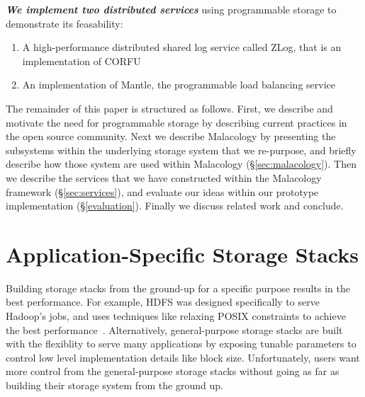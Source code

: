 \documentclass[preprint]{sigplanconf-eurosys}
\begin{document}
{\it \textbf{We implement two distributed services}} using programmable storage
to demonstrate its feasability:

\begin{enumerate}

\item A high-performance distributed shared log service called ZLog, that is an
implementation of CORFU~\cite{balakrishnan_corfu_2012}

\item An implementation of Mantle, the programmable load balancing
service~\cite{sevilla:sc15-mantle}

\end{enumerate}

The remainder of this paper is structured as follows. First, we describe and
motivate the need for programmable storage by describing current practices in
the open source community. Next we describe Malacology by presenting the
subsystems within the underlying storage system that we re-purpose, and briefly
describe how those system are used within Malacology (\S\ref{sec:malacology}).
Then we describe the services that we have constructed within the Malacology
framework (\S\ref{sec:services}), and evaluate our ideas within our prototype
implementation (\S\ref{evaluation}).  Finally we discuss related work and
conclude.

\section{Application-Specific Storage Stacks
}\label{highly-tailored-and-application-specifc-storage-systems}

Building storage stacks from the ground-up for a specific purpose results in
the best performance. For example, HDFS was designed specifically to serve
Hadoop's jobs, and uses techniques like relaxing POSIX constraints to achieve
the best performance~\cite{CITEME}. Alternatively, general-purpose storage
stacks are built with the flexiblity to serve many applications by exposing
tunable parameters to control low level implementation details like block size.
Unfortunately, users want more control from the general-purpose storage stacks
without going as far as building their storage system from the ground up.

\end{document}
